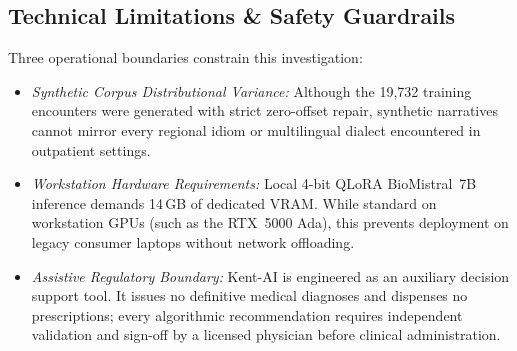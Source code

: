 \subsection{Technical Limitations \& Safety Guardrails}

Three operational boundaries constrain this investigation:
\begin{itemize}
    \item \textit{Synthetic Corpus Distributional Variance:} Although the 19,732 training encounters were generated with strict zero-offset repair, synthetic narratives cannot mirror every regional idiom or multilingual dialect encountered in outpatient settings.
    \item \textit{Workstation Hardware Requirements:} Local 4-bit QLoRA BioMistral~7B inference demands 14\,GB of dedicated VRAM. While standard on workstation GPUs (such as the RTX~5000 Ada), this prevents deployment on legacy consumer laptops without network offloading.
    \item \textit{Assistive Regulatory Boundary:} Kent-AI is engineered as an auxiliary decision support tool. It issues no definitive medical diagnoses and dispenses no prescriptions; every algorithmic recommendation requires independent validation and sign-off by a licensed physician before clinical administration.
\end{itemize}
